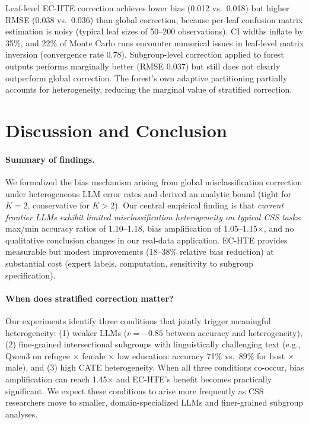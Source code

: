 \documentclass[11pt,a4paper]{article}
\begin{document}
Leaf-level EC-HTE correction achieves lower bias (0.012 vs.\ 0.018) but higher RMSE (0.038 vs.\ 0.036) than global correction, because per-leaf confusion matrix estimation is noisy (typical leaf sizes of 50--200 observations). CI widths inflate by 35\%, and 22\% of Monte Carlo runs encounter numerical issues in leaf-level matrix inversion (convergence rate 0.78). Subgroup-level correction applied to forest outputs performs marginally better (RMSE 0.037) but still does not clearly outperform global correction. The forest's own adaptive partitioning partially accounts for heterogeneity, reducing the marginal value of stratified correction.


\section{Discussion and Conclusion}
\label{sec:discussion}

\paragraph{Summary of findings.} We formalized the bias mechanism arising from global misclassification correction under heterogeneous LLM error rates and derived an analytic bound (tight for $K{=}2$, conservative for $K{>}2$). Our central empirical finding is that \emph{current frontier LLMs exhibit limited misclassification heterogeneity on typical CSS tasks}: max/min accuracy ratios of 1.10--1.18, bias amplification of 1.05--1.15$\times$, and no qualitative conclusion changes in our real-data application. EC-HTE provides measurable but modest improvements (18--38\% relative bias reduction) at substantial cost (expert labels, computation, sensitivity to subgroup specification).

\paragraph{When does stratified correction matter?} Our experiments identify three conditions that jointly trigger meaningful heterogeneity: (1) weaker LLMs ($r = -0.85$ between accuracy and heterogeneity), (2) fine-grained intersectional subgroups with linguistically challenging text (e.g., Qwen3 on refugee $\times$ female $\times$ low education: accuracy 71\% vs.\ 89\% for host $\times$ male), and (3) high CATE heterogeneity. When all three conditions co-occur, bias amplification can reach 1.45$\times$ and EC-HTE's benefit becomes practically significant. We expect these conditions to arise more frequently as CSS researchers move to smaller, domain-specialized LLMs and finer-grained subgroup analyses.
\end{document}
